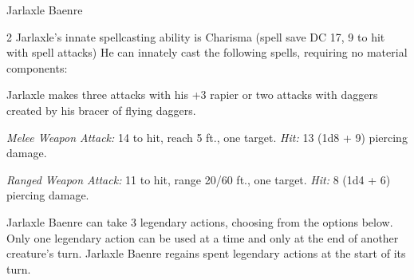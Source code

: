 \documentclass[10pt,a4paper,twoside,bg=print,twocolumn,openany,nodeprecatedcode]{dndbook}
\begin{document}
\begin{DndMonster}[float*=b,width=\textwidth + 8pt]{Jarlaxle Baenre}
\begin{multicols}{2}
Jarlaxle's innate spellcasting ability is Charisma (spell save DC 17, 9 to hit with spell attacks) He can innately cast the following spells, requiring no material components:
\begin{DndMonsterSpells}
\end{DndMonsterSpells}
Jarlaxle makes three attacks with his +3 rapier or two attacks with daggers created by his bracer of flying daggers.

\textsl{Melee Weapon Attack:} 14 to hit, reach 5 ft., one target. \textsl{Hit:} 13 (1d8 + 9) piercing damage.

\textsl{Ranged Weapon Attack:} 11 to hit, range 20/60 ft., one target. \textsl{Hit:} 8 (1d4 + 6) piercing damage.

Jarlaxle Baenre can take 3 legendary actions, choosing from the options below. Only one legendary action can be used at a time and only at the end of another creature's turn. Jarlaxle Baenre regains spent legendary actions at the start of its turn.

\begin{DndMonsterLegendaryActions}
\end{DndMonsterLegendaryActions}
\end{multicols}
\end{DndMonster}
\end{document}
